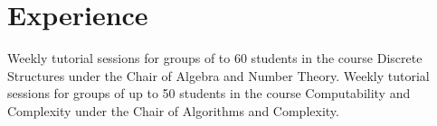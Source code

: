\section{Experience}
{Weekly tutorial sessions for groups of to 60 students in the course Discrete Structures under the Chair of Algebra and Number Theory.\newline{}}
{Weekly tutorial sessions for groups of up to 50 students in the course Computability and Complexity under the Chair of Algorithms and Complexity.\newline{}}
